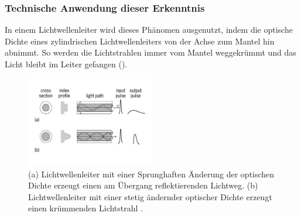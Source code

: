 \subsubsection{Technische Anwendung dieser Erkenntnis}
In einem Lichtwellenleiter wird dieses Phänomen ausgenutzt, 
indem  die  optische  Dichte  eines  zylindrischen
Lichtwellenleiters  von  der Achse zum Mantel hin abnimmt.
So werden die Lichtstrahlen immer vom Mantel weggekrümmt 
und das Licht  bleibt im Leiter gefangen ().
\begin{figure}[H]
\begin{center}
\includegraphics[width=0.5\textwidth]{./picture/Lichtwellenleiter.pdf}
	\caption{(a) Lichtwellenleiter mit einer Sprunghaften Änderung der optischen Dichte erzeugt einen am Übergang reflektierenden Lichtweg. 
	(b) Lichtwellenleiter mit einer stetig ändernder optischer Dichte erzeugt einen krümmenden Lichtstrahl \cite{opticFibre}. }
	\label{lichtleiter}
\end{center}	
\end{figure}
